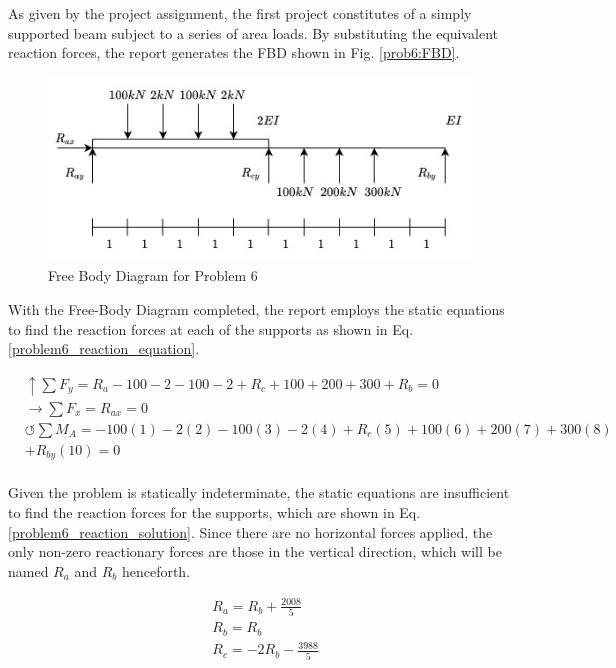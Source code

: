 \documentclass[a4paper]{article}
\begin{document}
As given by the project assignment, the first project constitutes of a simply supported beam subject to a series of area loads. By substituting the equivalent reaction forces, the report generates the FBD shown in Fig. \ref{prob6:FBD}.

\begin{figure}[h]
\includegraphics[width=\textwidth]{FBD/FBD_6.jpg}
\caption{Free Body Diagram for Problem 6}
\label{FBD_6}
\end{figure}

With the Free-Body Diagram completed, the report employs the static equations to find the reaction forces at each of the supports as shown in Eq. \ref{problem6_reaction_equation}.

\begin{equation}
\begin{split}
	&\uparrow \sum F_y = R_a - 100 - 2 - 100 -2 + R_c + 100 + 200 + 300 + R_b = 0 \\
 	&\rightarrow \sum F_x = R_{ax} = 0 \\
 	&\circlearrowleft \sum M_A = -100(1) - 2(2) -100(3) - 2(4) + R_c(5) +100(6) + 200(7) + 300(8) \\
	& + R_{by}(10) = 0\\
\end{split}
\label{problem6_reaction_equation}
\end{equation}

Given the problem is statically indeterminate, the static equations are insufficient to find the reaction forces for the supports, which are shown in Eq. \ref{problem6_reaction_solution}. Since there are no horizontal forces applied, the only non-zero reactionary forces are those in the vertical direction, which will be named $R_a$ and $R_b$ henceforth.

\begin{equation}
\begin{split}
	& R_a = R_b + \frac{2008}{5} \\
    	& R_b = R_b \\
    	& R_c = -2R_b -\frac{3988}{5} \\
\end{split}
\label{problem6_reaction_solution}
\end{equation}
\end{document}
